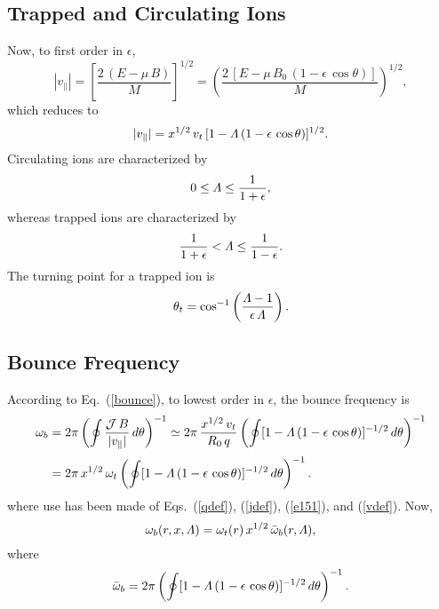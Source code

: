 \documentclass[12pt,prb,aps,notitlepage]{revtex4-1}
\begin{document}
\subsection{Trapped and Circulating Ions}
Now, to first order in $\epsilon$, 
\begin{equation}
|v_\parallel| = \left[\frac{2\,(E-\mu\,B)}{M}\right]^{1/2} =  \left(\frac{2\,[E-\mu\,B_0\,(1-\epsilon\,\cos\theta)]}{M}\right)^{1/2},
\end{equation}
which reduces to
\begin{equation}\label{vdef}
|v_\parallel|= x^{1/2}\,v_t\,[1-{\mit\Lambda}\,(1-\epsilon\,\cos\theta)]^{1/2}.
\end{equation}
Circulating ions are characterized by
\begin{equation}
0\leq {\mit\Lambda} \leq \frac{1}{1+\epsilon},
\end{equation}
whereas trapped ions are characterized by
\begin{equation}
\frac{1}{1+\epsilon} <{\mit\Lambda}\leq \frac{1}{1-\epsilon}.
\end{equation}
The turning point for a trapped ion is
\begin{equation}
\theta_t =\cos^{-1}\left(\frac{{\mit\Lambda}-1}{\epsilon\,{\mit\Lambda}}\right).
\end{equation}

\subsection{Bounce Frequency}
According to Eq.~(\ref{bounce}), to lowest order in $\epsilon$, the bounce frequency is 
\begin{align}
\omega_b &=2\pi\left(\oint\frac{{\cal J}\,B}{|v_\parallel|}\,d\theta\right)^{-1}\simeq 2\pi\,\frac{x^{1/2}\,v_t}{R_0\,q}
\left(\oint [1-{\mit\Lambda}\,(1-\epsilon\,\cos\theta)]^{-1/2}\,d\theta\right)^{-1}\nonumber\\[0.5ex]
&=2\pi\,x^{1/2}\,\omega_t\left(\oint [1-{\mit\Lambda}\,(1-\epsilon\,\cos\theta)]^{-1/2}\,d\theta\right)^{-1}.
\end{align}
where   use has been made of Eqs.~(\ref{qdef}), (\ref{jdef}),  (\ref{e151}), and (\ref{vdef}). 
Now,
\begin{equation}
\omega_b(r,x,{\mit\Lambda}) = \omega_t(r)\,x^{1/2}\,\bar{\omega}_b(r,{\mit\Lambda}),
\end{equation}
where 
\begin{equation}
\bar{\omega}_b =2\pi\left(\oint [1-{\mit\Lambda}\,(1-\epsilon\,\cos\theta)]^{-1/2}\,d\theta\right)^{-1}.
\end{equation}
\end{document}
